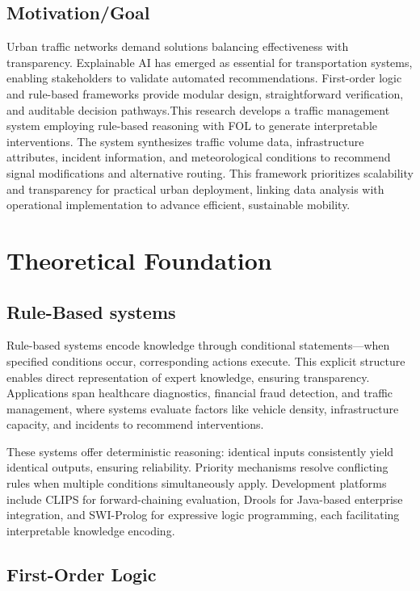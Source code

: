 \documentclass{article}
\begin{document}
\subsection{Motivation/Goal}

Urban traffic networks demand solutions balancing effectiveness with transparency. Explainable AI has emerged as essential for transportation systems, enabling stakeholders to validate automated recommendations. First-order logic and rule-based frameworks provide modular design, straightforward verification, and auditable decision pathways.This research develops a traffic management system employing rule-based reasoning with FOL to generate interpretable interventions. The system synthesizes traffic volume data, infrastructure attributes, incident information, and meteorological conditions to recommend signal modifications and alternative routing. This framework prioritizes scalability and transparency for practical urban deployment, linking data analysis with operational implementation to advance efficient, sustainable mobility.

\section{Theoretical Foundation}

\subsection{Rule-Based systems}

Rule-based systems encode knowledge through conditional statements—when specified conditions occur, corresponding actions execute. This explicit structure enables direct representation of expert knowledge, ensuring transparency. Applications span healthcare diagnostics, financial fraud detection, and traffic management, where systems evaluate factors like vehicle density, infrastructure capacity, and incidents to recommend interventions.

These systems offer deterministic reasoning: identical inputs consistently yield identical outputs, ensuring reliability. Priority mechanisms resolve conflicting rules when multiple conditions simultaneously apply. Development platforms include CLIPS for forward-chaining evaluation, Drools for Java-based enterprise integration, and SWI-Prolog for expressive logic programming, each facilitating interpretable knowledge encoding.

\subsection{First-Order Logic}
\end{document}
